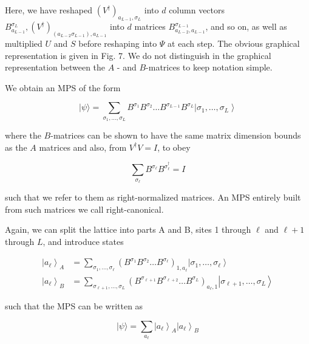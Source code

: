 \documentclass[12pt]{article}
\begin{document}
Here, we have reshaped $\left(V^{\dagger}\right)_{a_{L-1}, \sigma_{L}}$ into $d$ column vectors $B_{a_{L-1}}^{\sigma_{L}},\left(V^{\dagger}\right)_{\left(a_{L-2} \sigma_{L-1}\right), a_{L-1}}$ into $d$ matrices $B_{a_{L-2}, a_{L-1}}^{\sigma_{L-1}}$, and so on, as well as multiplied $U$ and $S$ before reshaping into $\Psi$ at each step. The obvious graphical representation is given in Fig. 7. We do not distinguish in the graphical representation between the $A$ - and $B$-matrices to keep notation simple.

We obtain an MPS of the form


\begin{equation*}
|\psi\rangle=\sum_{\sigma_{1}, \ldots, \sigma_{L}} B^{\sigma_{1}} B^{\sigma_{2}} \ldots B^{\sigma_{L-1}} B^{\sigma_{L}}\left|\sigma_{1}, \ldots, \sigma_{L}\right\rangle \tag{44}
\end{equation*}


where the $B$-matrices can be shown to have the same matrix dimension bounds as the $A$ matrices and also, from $V^{\dagger} V=I$, to obey


\begin{equation*}
\sum_{\sigma_{\ell}} B^{\sigma_{\ell}} B^{\sigma_{\ell}^{\dagger}}=I \tag{45}
\end{equation*}


such that we refer to them as right-normalized matrices. An MPS entirely built from such matrices we call right-canonical.

Again, we can split the lattice into parts A and B, sites 1 through $\ell$ and $\ell+1$ through $L$, and introduce states


\begin{align*}
\left|a_{\ell}\right\rangle_{A} & =\sum_{\sigma_{1}, \ldots, \sigma_{\ell}}\left(B^{\sigma_{1}} B^{\sigma_{2}} \ldots B^{\sigma_{\ell}}\right)_{1, a_{\ell}}\left|\sigma_{1}, \ldots, \sigma_{\ell}\right\rangle  \tag{46}\\
\left|a_{\ell}\right\rangle_{B} & =\sum_{\sigma_{\ell+1}, \ldots, \sigma_{L}}\left(B^{\sigma_{\ell+1}} B^{\sigma_{\ell+2}} \ldots B^{\sigma_{L}}\right)_{a_{\ell}, 1}\left|\sigma_{\ell+1}, \ldots, \sigma_{L}\right\rangle \tag{47}
\end{align*}


such that the MPS can be written as


\begin{equation*}
|\psi\rangle=\sum_{a_{\ell}}\left|a_{\ell}\right\rangle_{A}\left|a_{\ell}\right\rangle_{B} \tag{48}
\end{equation*}
\end{document}
